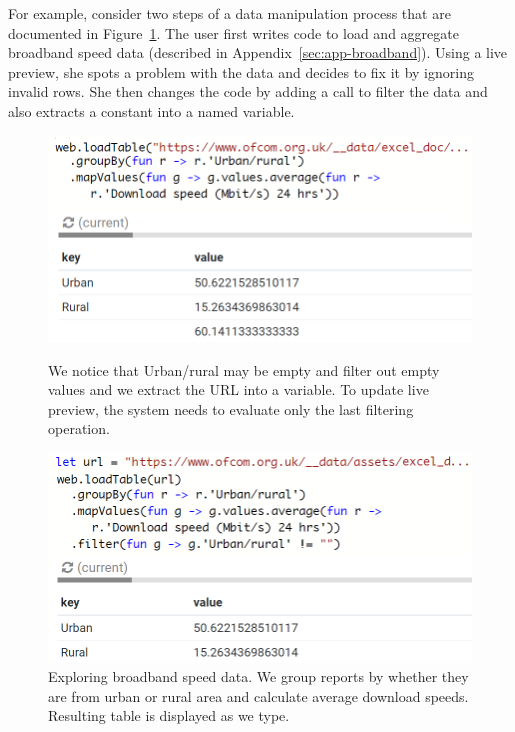 \documentclass[sigplan,10pt]{acmart}\settopmatter{printfolios=true,printccs=false,printacmref=false}
\theoremstyle{plain}
\theoremstyle{definition}
\begin{document}
For example, consider two steps of a data manipulation process that are documented in 
Figure~\ref{fig:intro-live}. The user first writes code to load and aggregate broadband speed data 
(described in Appendix~\ref{sec:app-broadband}). Using a live preview, she spots a problem with 
the data and decides to fix it by ignoring invalid rows. She then changes the code by adding
a call to filter the data and also extracts a constant into a named variable.


\begin{figure}[b]
\caption{\small{Exploring broadband speed data. We group reports by whether they are from urban
  or rural area and calculate average download speeds. Resulting table is displayed as we type.}}
\label{fig:intro-live}

\vspace{0.5em}
\noindent
\includegraphics[scale=0.38]{bb1.png}

\vspace{0.5em}
\justify
\small{We notice that Urban/rural may be empty and filter out empty values and we
  extract the URL into a variable. To update live preview, the system needs to evaluate
  only the last filtering operation.}

\vspace{0.75em}
\noindent
\includegraphics[scale=0.38]{bb2.png}
\end{figure}
\end{document}
